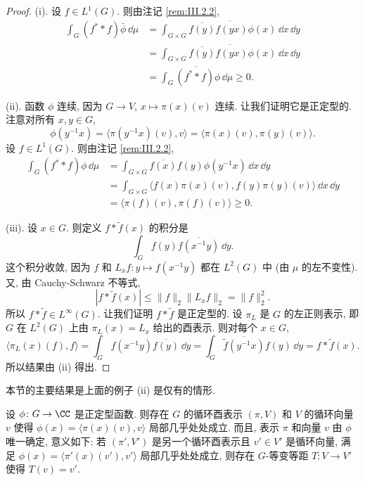 \begin{proof}
(i). 设 $f \in L^1(G)$. 则由注记 \ref{rem:III.2.2},
\begin{align*}
\int_G (f^* * f)\bar{\phi}\,\dd\mu &= \overline{\int_{G \times G}\overline{f(y)}f(yx)\phi(x)\,\dd x\,\dd y} \\
&= \overline{\int_{G \times G}\overline{f(y)}f(yx)\phi(x)\,\dd x\,\dd y} \\
&= \overline{\int_G (f^* * f)\phi\,\dd\mu} \geq 0.
\end{align*}

(ii). 函数 $\phi$ 连续, 因为 $G \to V$, $x \longmapsto \pi(x)(v)$ 连续. 让我们证明它是正定型的. 注意对所有 $x, y \in G$,
\[
\phi(y^{-1}x) = \langle \pi(y^{-1}x)(v), v \rangle = \langle \pi(x)(v), \pi(y)(v) \rangle.
\]
设 $f \in L^1(G)$. 则由注记 \ref{rem:III.2.2},
\begin{align*}
\int_G (f^* * f)\phi\,\dd\mu &= \int_{G \times G}\overline{f(x)}f(y)\phi(y^{-1}x)\,\dd x\,\dd y \\
&= \int_{G \times G}\langle f(x)\pi(x)(v), f(y)\pi(y)(v) \rangle\,\dd x\,\dd y \\
&= \langle \pi(f)(v), \pi(f)(v) \rangle \geq 0.
\end{align*}

(iii). 设 $x \in G$. 则定义 $f * \tilde{f}(x)$ 的积分是
\[
\int_G f(y)\overline{f(x^{-1}y)}\,\dd y.
\]
这个积分收敛, 因为 $f$ 和 $L_xf \colon y \longmapsto f(x^{-1}y)$ 都在 $L^2(G)$ 中 (由 $\mu$ 的左不变性). 又, 由 Cauchy-Schwarz 不等式,
\[
|f * \tilde{f}(x)| \leq \|f\|_2\|L_xf\|_2 = \|f\|_2^2.
\]
所以 $f * \tilde{f} \in L^{\infty}(G)$.
让我们证明 $f * \tilde{f}$ 是正定型的. 设 $\pi_L$ 是 $G$ 的左正则表示, 即 $G$ 在 $L^2(G)$ 上由 $\pi_L(x) = L_x$ 给出的酉表示. 则对每个 $x \in G$,
\[
\langle \pi_L(x)(f), f \rangle = \int_G f(x^{-1}y)\overline{f(y)}\,\dd y = \int_G \overline{\tilde{f}(y^{-1}x)}f(y)\,\dd y = f * \tilde{f}(x).
\]
所以结果由 (ii) 得出.
\end{proof}

本节的主要结果是上面的例子 (ii) 是仅有的情形.

\begin{theorem}
\label{thm:III.2.5}
设 $\phi \colon G \to \CC$ 是正定型函数. 则存在 $G$ 的循环酉表示 $(\pi, V)$ 和 $V$ 的循环向量 $v$ 使得 $\phi(x) = \langle \pi(x)(v), v \rangle$ 局部几乎处处成立.
而且, 表示 $\pi$ 和向量 $v$ 由 $\phi$ 唯一确定, 意义如下: 若 $(\pi', V')$ 是另一个循环酉表示且 $v' \in V'$ 是循环向量, 满足 $\phi(x) = \langle \pi'(x)(v'), v' \rangle$ 局部几乎处处成立, 则存在 $G$-等变等距 $T \colon V \to V'$ 使得 $T(v) = v'$.
\end{theorem}

